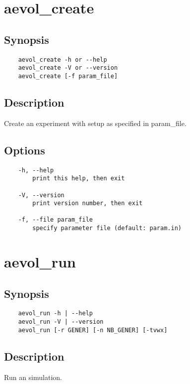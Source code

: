 \label{app:manpages}


\section{aevol\_create}
\label{sec:aevol-create}

\subsection*{Synopsis}
\begin{verbatim}
    aevol_create -h or --help
   	aevol_create -V or --version
   	aevol_create [-f param_file]
\end{verbatim}

\subsection*{Description}
Create an experiment with setup as specified in param\_file.

\subsection*{Options}
\begin{verbatim}
    -h, --help
        print this help, then exit

   	-V, --version
        print version number, then exit

   	-f, --file param_file
        specify parameter file (default: param.in)
\end{verbatim}


\section{aevol\_run}
\label{sec:aevol-run}

\subsection*{Synopsis}
\begin{verbatim}
    aevol_run -h | --help
    aevol_run -V | --version
    aevol_run [-r GENER] [-n NB_GENER] [-tvwx]
\end{verbatim}

\subsection*{Description}
Run an \aevol{} simulation.


